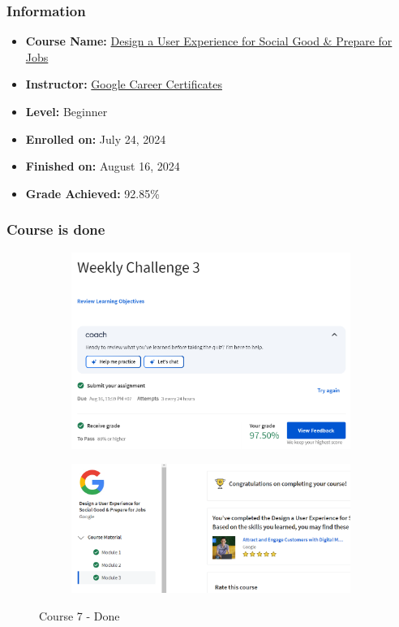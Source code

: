 \subsubsection{Information}
\begin{itemize}
	\item \textbf{Course Name:} \href{https://www.coursera.org/learn/ux-design-jobs}{Design a User Experience for Social Good \& Prepare for Jobs}
	\item \textbf{Instructor:} \href{https://www.coursera.org/instructor/google-career-certificates}{Google Career Certificates}
	\item \textbf{Level:} Beginner
	\item \textbf{Enrolled on:} July 24, 2024
	\item \textbf{Finished on:} August 16, 2024
	\item \textbf{Grade Achieved:} 92.85\%
\end{itemize}

\subsubsection{Course is done}
\begin{figure}[!ht]
	\centering
	\begin{subfigure}{0.75\textwidth}
		\centering
		\includegraphics[width=\textwidth]{imgs/Course7-M3.png}
	\end{subfigure}
	\hfill
	\begin{subfigure}{0.75\textwidth}
		\centering
		\includegraphics[width=\textwidth]{imgs/Course7-Done.png}
	\end{subfigure}
	\caption{Course 7 - Done}
\end{figure}

